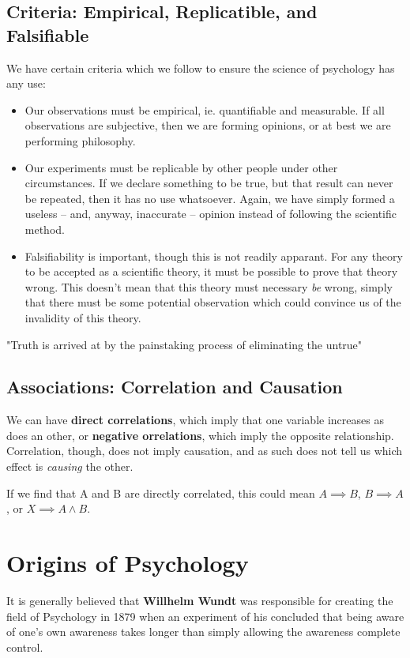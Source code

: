 \documentclass[12pt]{article}
\begin{document}
\subsection*{Criteria: Empirical, Replicatible, and Falsifiable}
We have certain criteria which we follow to ensure the science of psychology has any use:
\begin{itemize}
\item Our observations must be empirical, ie. quantifiable and measurable. If all observations are subjective, then we are forming opinions, or at best we are performing philosophy.
\item Our experiments must be replicable by other people under other circumstances. If we declare something to be true, but that result can never be repeated, then it has no use whatsoever. Again, we have simply formed a useless -- and, anyway, inaccurate -- opinion instead of following the scientific method.
\item Falsifiability is important, though this is not readily apparant. For any theory to be accepted as a scientific theory, it must be possible to prove that theory wrong. This doesn't mean that this theory must necessary {\it be} wrong, simply that there must be some potential observation which could convince us of the invalidity of this theory.
\end{itemize}
"Truth is arrived at by the painstaking process of eliminating the untrue"

\subsection*{Associations: Correlation and Causation}
We can have {\bf direct correlations}, which imply that one variable increases as does an other, or {\bf negative orrelations}, which imply the opposite relationship. Correlation, though, does not imply causation, and as such does not tell us which effect is {\it causing} the other.

If we find that A and B are directly correlated, this could mean $A \implies B$, $B \implies A$, or $X \implies A \land B$.

\section*{Origins of Psychology}
It is generally believed that {\bf Willhelm Wundt} was responsible for creating the field of Psychology in 1879 when an experiment of his concluded that being aware of one's own awareness takes longer than simply allowing the awareness complete control.
\end{document}
